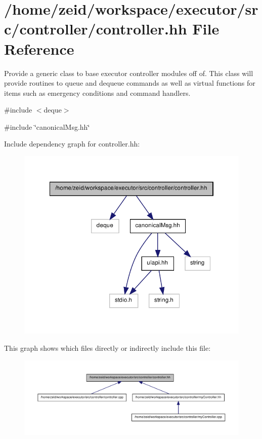 \hypertarget{controller_8hh}{
\section{/home/zeid/workspace/executor/src/controller/controller.hh File Reference}
\label{controller_8hh}
}


Provide a generic class to base executor controller modules off of. This class will provide routines to queue and dequeue commands as well as virtual functions for items such as emergency conditions and command handlers.  


{\ttfamily \#include $<$deque$>$}\par
{\ttfamily \#include \char`\"{}canonicalMsg.hh\char`\"{}}\par
Include dependency graph for controller.hh:\nopagebreak
\begin{figure}[H]
\begin{center}
\leavevmode
\includegraphics[width=334pt]{controller_8hh__incl}
\end{center}
\end{figure}
This graph shows which files directly or indirectly include this file:\nopagebreak
\begin{figure}[H]
\begin{center}
\leavevmode
\includegraphics[width=400pt]{controller_8hh__dep__incl}
\end{center}
\end{figure}
